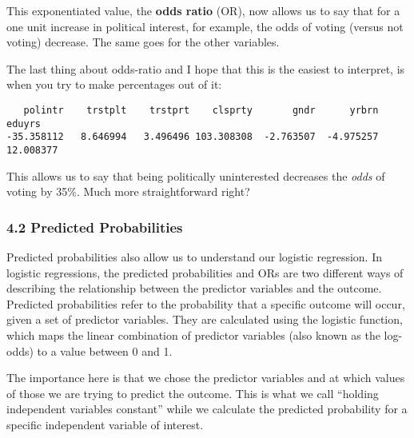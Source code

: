 \documentclass[
  letterpaper,
  DIV=11,
  numbers=noendperiod]{scrreprt}
\newenvironment{Shaded}{\begin{snugshade}}{\end{snugshade}}
\newcommand{\CommentTok}[1]{\textcolor[rgb]{0.37,0.37,0.37}{#1}}
\newcommand{\DecValTok}[1]{\textcolor[rgb]{0.68,0.00,0.00}{#1}}
\newcommand{\FunctionTok}[1]{\textcolor[rgb]{0.28,0.35,0.67}{#1}}
\newcommand{\NormalTok}[1]{\textcolor[rgb]{0.00,0.23,0.31}{#1}}
\newcommand{\SpecialCharTok}[1]{\textcolor[rgb]{0.37,0.37,0.37}{#1}}
\begin{document}
This exponentiated value, the \textbf{odds ratio} (OR), now allows us to
say that for a one unit increase in political interest, for example, the
odds of voting (versus not voting) decrease. The same goes for the other
variables.

The last thing about odds-ratio and I hope that this is the easiest to
interpret, is when you try to make percentages out of it:

\begin{Shaded}
\end{Shaded}

\begin{verbatim}
   polintr    trstplt    trstprt    clsprty       gndr      yrbrn     eduyrs 
-35.358112   8.646994   3.496496 103.308308  -2.763507  -4.975257  12.008377 
\end{verbatim}

This allows us to say that being politically uninterested decreases the
\emph{odds} of voting by 35\%. Much more straightforward right?

\hypertarget{predicted-probabilities}{%
\subsubsection{4.2 Predicted
Probabilities}\label{predicted-probabilities}}

Predicted probabilities also allow us to understand our logistic
regression. In logistic regressions, the predicted probabilities and ORs
are two different ways of describing the relationship between the
predictor variables and the outcome. Predicted probabilities refer to
the probability that a specific outcome will occur, given a set of
predictor variables. They are calculated using the logistic function,
which maps the linear combination of predictor variables (also known as
the log-odds) to a value between 0 and 1.

The importance here is that we chose the predictor variables and at
which values of those we are trying to predict the outcome. This is what
we call ``holding independent variables constant'' while we calculate
the predicted probability for a specific independent variable of
interest.
\end{document}
